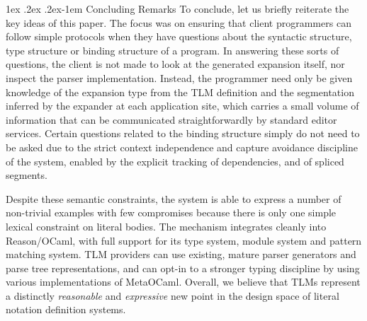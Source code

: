 \documentclass[acmsmall]{acmart}
\makeatletter
\renewcommand{\paragraph}{%
  \@startsection{paragraph}{4}%
  {\z@}{1ex \@plus .2ex \@minus .2ex}{-1em}%
  {\normalfont\normalsize\bfseries}%
}
\makeatother
\begin{document}



\paragraph{Concluding Remarks} 
To conclude, let us briefly reiterate the key ideas of this paper. The focus was on ensuring that client programmers can follow simple protocols when they have questions about the syntactic structure, type structure or binding structure of a program. In answering these sorts of questions,  the client is not made to look at the generated expansion itself, nor inspect the parser implementation. Instead, the programmer need only be given knowledge of the expansion type from the TLM definition and the segmentation inferred by the expander at each application site, which carries a small volume of information that can be communicated straightforwardly by standard editor services. Certain questions related to the binding structure simply do not need to be asked due to the strict context independence and capture avoidance discipline of the system, enabled by the explicit tracking of dependencies, and of spliced segments. 

Despite these semantic constraints, the system is able to express a number of non-trivial examples with few compromises because there is only one simple lexical constraint on literal bodies. The mechanism integrates cleanly into Reason/OCaml, with full support for its type system, module system and pattern matching system. TLM providers can use existing, mature parser generators and parse tree representations, and can opt-in to a stronger typing discipline by using various implementations of MetaOCaml. Overall, we believe that TLMs represent a distinctly \emph{reasonable} and \emph{expressive} new point in the design space of literal notation definition systems.
\end{document}
